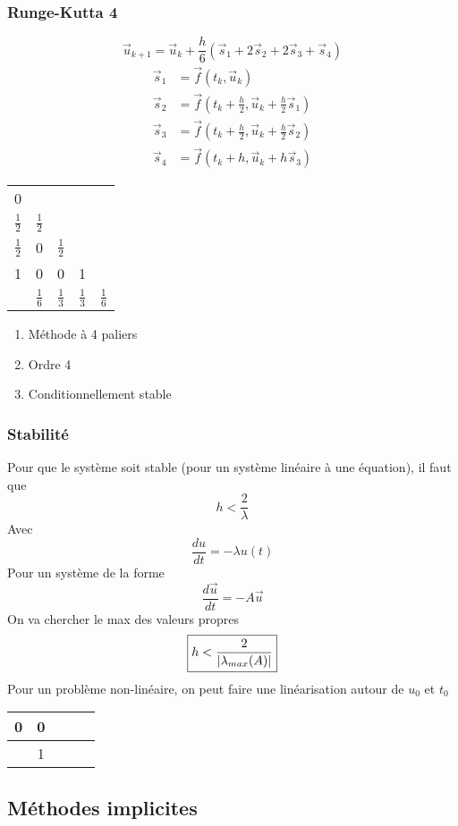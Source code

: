 \documentclass[resume]{subfiles}
\begin{document}
\subsubsection{Runge-Kutta 4}
$$\boxed{\vec{u}_{k+1}=\vec{u}_k+\frac{h}{6}\left(\vec{s}_1+2\vec{s}_2+2\vec{s}_3+\vec{s}_4\right)}$$
\begin{align*}
\vec{s}_1&=\vec{f}(t_k,\vec{u}_k)\\
\vec{s}_2&=\vec{f}\left(t_k+\frac{h}{2},\vec{u}_k+\frac{h}{2}\vec{s}_1\right)\\
\vec{s}_3&=\vec{f}\left(t_k+\frac{h}{2},\vec{u}_k+\frac{h}{2}\vec{s}_2\right)\\
\vec{s}_4&=\vec{f}\left(t_k+h,\vec{u}_k+h\vec{s}_3\right)
\end{align*}
\begin{table}[H]
\centering
\renewcommand{\arraystretch}{1.5}
\begin{tabular}{c|cccc}
0 & \\
$\frac{1}{2}$ & $\frac{1}{2}$\\
$\frac{1}{2}$ & 0 & $\frac{1}{2}$\\
1 & 0 & 0 & 1\\\hline
 & $\frac{1}{6}$ & $\frac{1}{3}$ & $\frac{1}{3}$ & $\frac{1}{6}$
\end{tabular}
\end{table}
\begin{enumerate}
\item Méthode à 4 paliers
\item Ordre 4
\item Conditionnellement stable
\end{enumerate}
\subsubsection{Stabilité}
Pour que le système soit stable (pour un système linéaire à une équation), il faut que
$$\boxed{h<\frac{2}{\lambda}}$$
Avec
$$\frac{du}{dt}=-\lambda u(t)$$
Pour un système de la forme
$$\frac{d\vec{u}}{dt}=-A\vec{u}$$
On va chercher le max des valeurs propres
$$\boxed{h<\frac{2}{\abs{\lambda_{max}(A)}}}$$
Pour un problème non-linéaire, on peut faire une linéarisation autour de $u_0$ et $t_0$
\begin{table}[H]
\centering
\renewcommand{\arraystretch}{1.5}
\begin{tabular}{c|cccc}
0 & 0\\\hline
 & 1
\end{tabular}
\end{table}
\subsection{Méthodes implicites}
\end{document}
